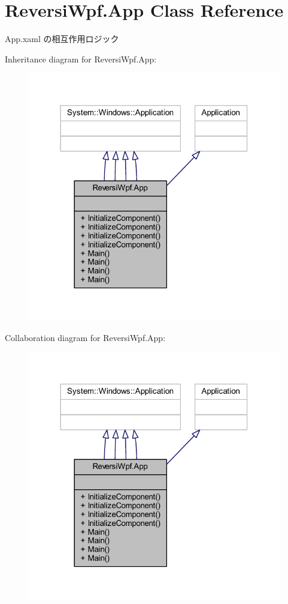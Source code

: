 \hypertarget{class_reversi_wpf_1_1_app}{}\section{Reversi\+Wpf.\+App Class Reference}
\label{class_reversi_wpf_1_1_app}


App.\+xaml の相互作用ロジック  




Inheritance diagram for Reversi\+Wpf.\+App\+:
\nopagebreak
\begin{figure}[H]
\begin{center}
\leavevmode
\includegraphics[width=314pt]{class_reversi_wpf_1_1_app__inherit__graph}
\end{center}
\end{figure}


Collaboration diagram for Reversi\+Wpf.\+App\+:
\nopagebreak
\begin{figure}[H]
\begin{center}
\leavevmode
\includegraphics[width=314pt]{class_reversi_wpf_1_1_app__coll__graph}
\end{center}
\end{figure}
